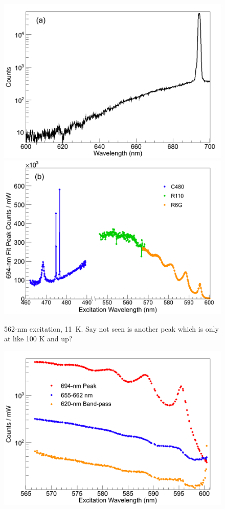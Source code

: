 \begin{figure} %
        \centering
                \includegraphics[width=.7\textwidth]{figures/Cr_a.png}
                \includegraphics[width=.7\textwidth]{figures/Cr_b.png}
                \caption{562-nm excitation, 11~K.  Say not seen is another peak which is only at like 100 K and up?}
\label{fig:Cr}
\end{figure}

\begin{figure} %
        \centering
                \includegraphics[width=.7\textwidth]{figures/Cr_broad.png}
                \caption{}
        \label{fig:CrBroad}
\end{figure}

